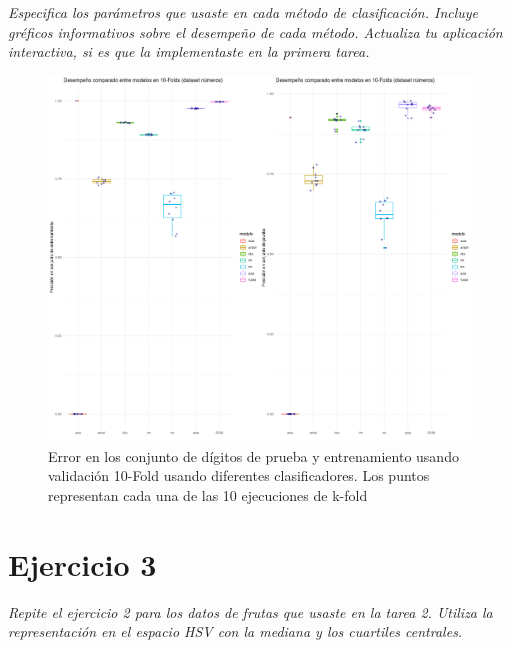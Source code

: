\documentclass[paper=letter, fontsize=11pt]{scrartcl}
\numberwithin{equation}{section} %
\numberwithin{figure}{section} %
\numberwithin{table}{section} %
\begin{document}
\textit{Especifica los parámetros que usaste en cada método de clasificación. Incluye gréficos informativos sobre el desempeño de cada método. Actualiza tu aplicación interactiva, si es que la implementaste en la primera tarea.}

\begin{figure}[H]
  \begin{center}
    \includegraphics[scale =.35]{comparacionmodelos.png}
    \caption{Error en los conjunto de dígitos  de prueba y entrenamiento usando validación 10-Fold usando diferentes clasificadores. Los puntos representan cada una de las 10 ejecuciones de k-fold }
    \label{figura1_2}
  \end{center}
\end{figure}
\FloatBarrier

\section{Ejercicio 3}
\textit{Repite el ejercicio 2 para los datos de frutas que usaste en la tarea 2. Utiliza la representación en el espacio HSV con la mediana y los cuartiles centrales.} \\
\end{document}
